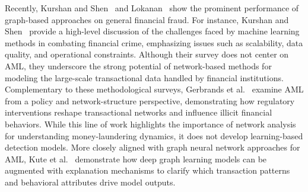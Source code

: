 \documentclass[11pt,english]{article}
\begin{document}
Recently, Kurshan and Shen~\parencite*{kurshan2020graph} and Lokanan~\parencite*{lokanan2023financial} show the prominent performance of graph-based approaches on general financial fraud. For instance, Kurshan and Shen~\parencite*{kurshan2020graph} provide a high-level discussion of the challenges faced by machine learning methods in combating financial crime, emphasizing issues such as scalability, data quality, and operational constraints. Although their survey does not center on AML, they underscore the strong potential of network-based methods for modeling the large-scale transactional data handled by financial institutions. Complementary to these methodological surveys, Gerbrands et al.~\parencite*{gerbrands2022effect} examine AML from a policy and network-structure perspective, demonstrating how regulatory interventions reshape transactional networks and influence illicit financial behaviors. While this line of work highlights the importance of network analysis for understanding money-laundering dynamics, it does not develop learning-based detection models. More closely aligned with graph neural network approaches for AML, Kute et al.~\parencite*{kute2022explainable, kute2024explainable} demonstrate how deep graph learning models can be augmented with explanation mechanisms to clarify which transaction patterns and behavioral attributes drive model outputs. 
\end{document}
